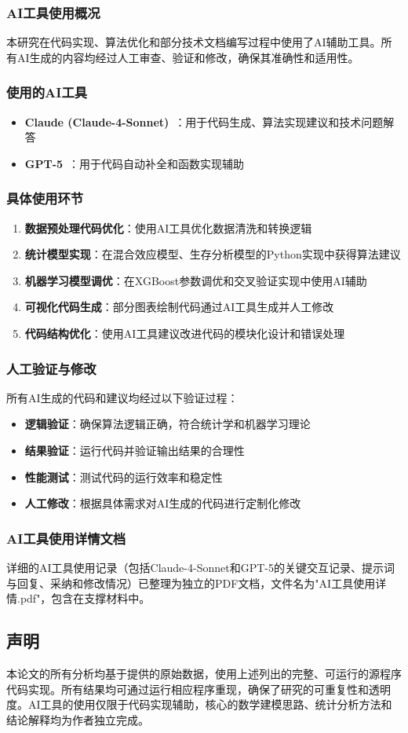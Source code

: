 \documentclass[withoutpreface]{cumcmthesis}
\begin{document}
\subsubsection{AI工具使用概况}
本研究在代码实现、算法优化和部分技术文档编写过程中使用了AI辅助工具。所有AI生成的内容均经过人工审查、验证和修改，确保其准确性和适用性。

\subsubsection{使用的AI工具}
\begin{itemize}
    \item \textbf{Claude (Claude-4-Sonnet)}~\cite{Claude}：用于代码生成、算法实现建议和技术问题解答
    \item \textbf{GPT-5}~\cite{GPT5}：用于代码自动补全和函数实现辅助
\end{itemize}

\subsubsection{具体使用环节}
\begin{enumerate}
    \item \textbf{数据预处理代码优化}：使用AI工具优化数据清洗和转换逻辑
    \item \textbf{统计模型实现}：在混合效应模型、生存分析模型的Python实现中获得算法建议
    \item \textbf{机器学习模型调优}：在XGBoost参数调优和交叉验证实现中使用AI辅助
    \item \textbf{可视化代码生成}：部分图表绘制代码通过AI工具生成并人工修改
    \item \textbf{代码结构优化}：使用AI工具建议改进代码的模块化设计和错误处理
\end{enumerate}

\subsubsection{人工验证与修改}
所有AI生成的代码和建议均经过以下验证过程：
\begin{itemize}
    \item \textbf{逻辑验证}：确保算法逻辑正确，符合统计学和机器学习理论
    \item \textbf{结果验证}：运行代码并验证输出结果的合理性
    \item \textbf{性能测试}：测试代码的运行效率和稳定性
    \item \textbf{人工修改}：根据具体需求对AI生成的代码进行定制化修改
\end{itemize}

\subsubsection{AI工具使用详情文档}
详细的AI工具使用记录（包括Claude-4-Sonnet和GPT-5的关键交互记录、提示词与回复、采纳和修改情况）已整理为独立的PDF文档，文件名为"AI工具使用详情.pdf"，包含在支撑材料中。

\subsection{声明}

本论文的所有分析均基于提供的原始数据，使用上述列出的完整、可运行的源程序代码实现。所有结果均可通过运行相应程序重现，确保了研究的可重复性和透明度。AI工具的使用仅限于代码实现辅助，核心的数学建模思路、统计分析方法和结论解释均为作者独立完成。
\end{document}
